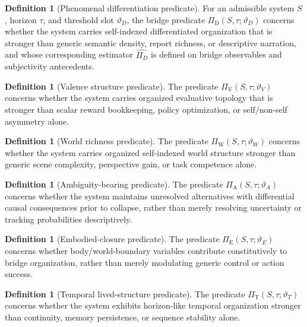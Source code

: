 \documentclass[11pt,a4paper]{article}
\theoremstyle{definition}
\newtheorem{definition}[theorem]{Definition}
\newcommand{\PiD}{\Pi_{\mathrm{D}}}
\newcommand{\PiV}{\Pi_{\mathrm{V}}}
\newcommand{\PiW}{\Pi_{\mathrm{W}}}
\newcommand{\PiA}{\Pi_{\mathrm{A}}}
\newcommand{\PiE}{\Pi_{\mathrm{E}}}
\newcommand{\PiT}{\Pi_{\mathrm{T}}}
\begin{document}
\begin{definition}[Phenomenal differentiation predicate]
For an admissible system $S$, horizon $\tau$, and threshold slot $\vartheta_D$, the bridge predicate $\PiD(S,\tau;\vartheta_D)$ concerns whether the system carries self-indexed differentiated organization that is stronger than generic semantic density, report richness, or descriptive narration, and whose corresponding estimator $\widehat{\Pi_D}$ is defined on bridge observables and subjectivity antecedents.
\end{definition}

\begin{definition}[Valence structure predicate]
The predicate $\PiV(S,\tau;\vartheta_V)$ concerns whether the system carries organized evaluative topology that is stronger than scalar reward bookkeeping, policy optimization, or self/non-self asymmetry alone.
\end{definition}

\begin{definition}[World richness predicate]
The predicate $\PiW(S,\tau;\vartheta_W)$ concerns whether the system carries organized self-indexed world structure stronger than generic scene complexity, perspective gain, or task competence alone.
\end{definition}

\begin{definition}[Ambiguity-bearing predicate]
The predicate $\PiA(S,\tau;\vartheta_A)$ concerns whether the system maintains unresolved alternatives with differential causal consequences prior to collapse, rather than merely resolving uncertainty or tracking probabilities descriptively.
\end{definition}

\begin{definition}[Embodied-closure predicate]
The predicate $\PiE(S,\tau;\vartheta_E)$ concerns whether body/world-boundary variables contribute constitutively to bridge organization, rather than merely modulating generic control or action success.
\end{definition}

\begin{definition}[Temporal lived-structure predicate]
The predicate $\PiT(S,\tau;\vartheta_T)$ concerns whether the system exhibits horizon-like temporal organization stronger than continuity, memory persistence, or sequence stability alone.
\end{definition}
\end{document}

